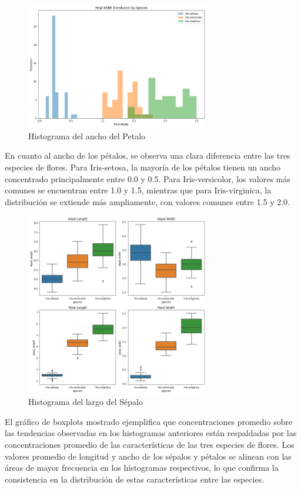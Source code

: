 \documentclass[conference]{IEEEtran}
\begin{document}
\begin{figure}[ht]
  \includegraphics[width=80mm]{images/petal_width.png}
  \caption{Histograma del ancho del Petalo}\label{fig4}
\end{figure}
\FloatBarrier

En cuanto al ancho de los pétalos, se observa una clara diferencia entre las tres especies de flores. Para Iris-setosa, la mayoría de los pétalos tienen un ancho concentrado principalmente entre 0.0 y 0.5. Para Iris-versicolor, los valores más comunes se encuentran entre 1.0 y 1.5, mientras que para Iris-virginica, la distribución se extiende más ampliamente, con valores comunes entre 1.5 y 2.0.

\begin{figure}[ht]
  \includegraphics[width=80mm]{images/boxplot.png}
  \caption{Histograma del largo del Sépalo}\label{fig5}
\end{figure}
\FloatBarrier

El gráfico de boxplots mostrado ejemplifica que concentraciones promedio sobre las tendencias observadas en los histogramas anteriores están respaldadas por las concentraciones promedio de las características de las tres especies de flores. Los valores promedio de longitud y ancho de los sépalos y pétalos se alinean con las áreas de mayor frecuencia en los histogramas respectivos, lo que confirma la consistencia en la distribución de estas características entre las especies.
\end{document}

